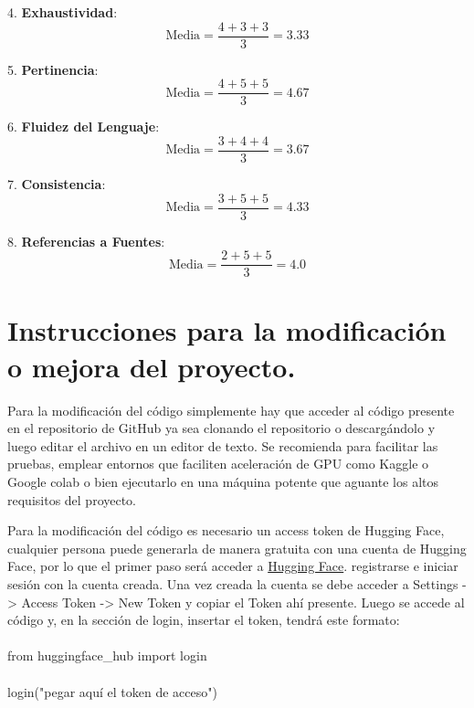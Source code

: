 4. \textbf{Exhaustividad}:
\begin{equation}
\text{Media} = \frac{4 + 3 + 3}{3} = 3.33
\end{equation}

5. \textbf{Pertinencia}:
\begin{equation}
\text{Media} = \frac{4 + 5 + 5}{3} = 4.67
\end{equation}

6. \textbf{Fluidez del Lenguaje}:
\begin{equation}
\text{Media} = \frac{3 + 4 + 4}{3} = 3.67
\end{equation}

7. \textbf{Consistencia}:
\begin{equation}
\text{Media} = \frac{3 + 5 + 5}{3} = 4.33
\end{equation}

8. \textbf{Referencias a Fuentes}:
\begin{equation}
\text{Media} = \frac{2 + 5 + 5}{3} = 4.0
\end{equation}

\section{Instrucciones para la modificación o mejora del proyecto.}

Para la modificación del código simplemente hay que acceder al código presente en el repositorio de GitHub ya sea clonando el repositorio o descargándolo y luego editar el archivo en un editor de texto. Se recomienda para facilitar las pruebas, emplear entornos que faciliten aceleración de GPU como Kaggle o Google colab o bien ejecutarlo en una máquina potente que aguante los altos requisitos del proyecto.

Para la modificación del código es necesario un access token de Hugging Face, cualquier persona puede generarla de manera gratuita con una cuenta de Hugging Face, por lo que el primer paso será acceder a \href{https://huggingface.co/}{Hugging Face}. registrarse e iniciar sesión con la cuenta creada.
Una vez creada la cuenta se debe acceder a Settings -> Access Token -> New Token y copiar el Token ahí presente.
Luego se accede al código y, en la sección de login, insertar el token, tendrá este formato:
\\
\\
from huggingface\_hub import login \\ \\
login("pegar aquí el token de acceso")